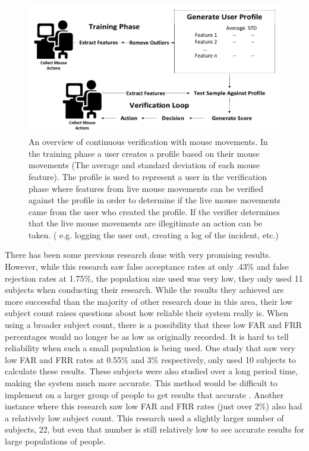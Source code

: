\documentclass[conference]{IEEEtran}
\begin{document}
\begin{figure}[t!]
  \includegraphics[width=1\linewidth]{Overview.pdf}
\caption{An overview of continuous verification with mouse movements. In the training phase a user creates a profile based on their mouse movements (The average and standard deviation of each mouse feature). The profile is used to represent a user in the verification phase where features from live mouse movements can be verified against the profile in order to determine if the live mouse movements came from the user who created the profile. If the verifier determines that the live mouse movements are illegitimate an action can be taken. ( e.g. logging the user out, creating a log of the incident, etc.)}
\end{figure}


There has been some previous research done with very promising results. However, while this research saw false acceptance rates at only .43\% and false rejection rates at 1.75\%, the population size used was very low, they only used 11 subjects when conducting their research. While the results they achieved are more successful than the majority of other research done in this area, their low subject count raises questions about how reliable their system really is. When using a broader subject count, there is a possibility that these low FAR and FRR percentages would no longer be as low as originally recorded. It is hard to tell reliability when such a small population is being used. \cite{Pus} One study that saw very low FAR and FRR rates at 0.55\% and 3\% respectively, only used 10 subjects to calculate these results. These subjects were also studied over a long period time, making the system much more accurate. This method would be difficult to implement on a larger group of people to get results that accurate \cite{She}. Another instance where this research saw low FAR and FRR rates (just over 2\%) also had a relatively low subject count. This research used a slightly larger number of subjects, 22, but even that number is still relatively low to see accurate results for large populations of people. \cite{Ahmed}
\end{document}
